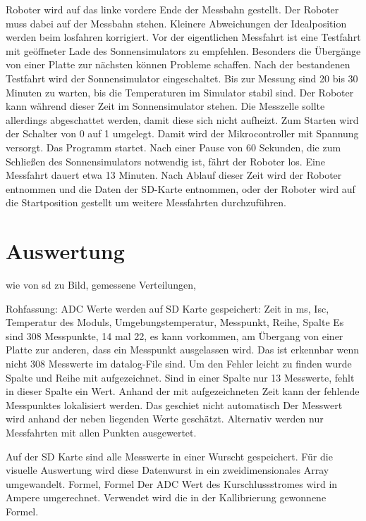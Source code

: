 \documentclass[a4paper,bibtotoc,oneside]{scrbook}
\begin{document}
Roboter wird auf das linke vordere Ende der Messbahn gestellt. Der Roboter muss dabei auf der Messbahn stehen. Kleinere Abweichungen der Idealposition werden beim losfahren korrigiert. 
Vor der eigentlichen Messfahrt ist eine Testfahrt mit geöffneter Lade des Sonnensimulators zu empfehlen. Besonders die Übergänge von einer Platte zur nächsten können Probleme schaffen.
Nach der bestandenen Testfahrt wird der Sonnensimulator eingeschaltet. Bis zur Messung sind 20 bis 30 Minuten zu warten, bis die Temperaturen im Simulator stabil sind. Der Roboter kann während dieser Zeit im Sonnensimulator stehen. Die Messzelle sollte allerdings abgeschattet werden, damit diese sich nicht aufheizt. 
Zum Starten wird der Schalter von 0 auf 1 umgelegt. Damit wird der Mikrocontroller mit Spannung versorgt. Das Programm startet. Nach einer Pause von 60 Sekunden, die zum Schließen des Sonnensimulators notwendig ist, fährt der Roboter los. Eine Messfahrt dauert etwa 13 Minuten. Nach Ablauf dieser Zeit wird der Roboter entnommen und die Daten der SD-Karte entnommen, oder der Roboter wird auf die Startposition gestellt um weitere Messfahrten durchzuführen.


\section{Auswertung}\thispagestyle{empty}


wie von sd  zu Bild,
gemessene Verteilungen,

Rohfassung: ADC Werte werden auf SD Karte gespeichert:
Zeit in ms, Isc, Temperatur des Moduls, Umgebungstemperatur, Messpunkt, Reihe, Spalte
Es sind 308 Messpunkte, 14 mal 22, es kann vorkommen, am Übergang von einer Platte zur anderen, dass ein Messpunkt ausgelassen wird. Das ist erkennbar wenn nicht 308 Messwerte im datalog-File sind. Um den Fehler leicht zu finden wurde Spalte und Reihe mit aufgezeichnet. Sind in einer Spalte nur 13 Messwerte, fehlt in dieser Spalte ein Wert. Anhand der mit aufgezeichneten Zeit kann der fehlende Messpunktes lokalisiert werden. Das geschiet nicht automatisch Der Messwert wird anhand der neben liegenden Werte geschätzt. Alternativ werden nur Messfahrten mit allen Punkten ausgewertet.

Auf der SD Karte sind alle Messwerte in einer Wurscht gespeichert. Für die visuelle Auswertung wird diese Datenwurst in ein zweidimensionales Array umgewandelt. 
Formel, Formel
Der ADC Wert des Kurschlussstromes wird in Ampere umgerechnet. Verwendet wird die in der Kallibrierung gewonnene Formel.
\end{document}
